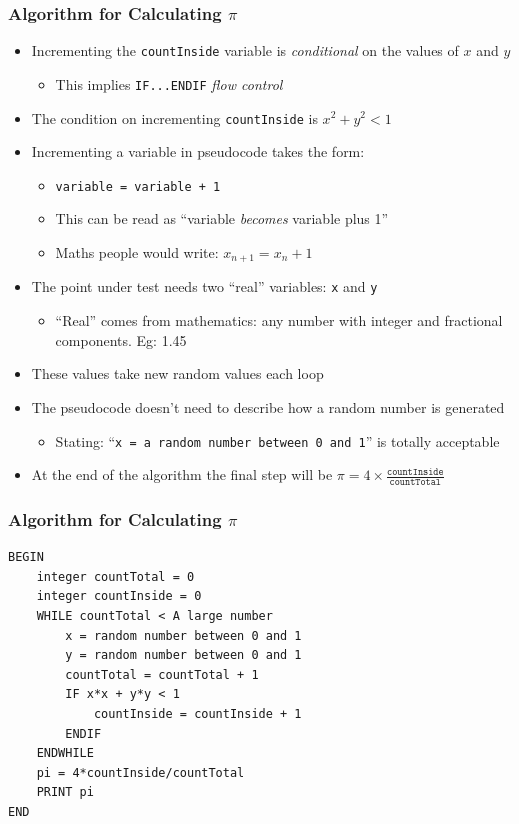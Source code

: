 \documentclass[14pt]{beamer}
\begin{document}
\begin{frame}
\frametitle{Algorithm for Calculating $\pi$}
\begin{itemize}
\item Incrementing the \texttt{countInside} variable is \textit{conditional} on the values of $x$ and $y$
	\begin{itemize}
		\item This implies \texttt{IF...ENDIF} \textit{flow control}
	\end{itemize}
\pause
\item The condition on incrementing \texttt{countInside} is $x^2 + y^2 < 1$
\pause
\item Incrementing a variable in pseudocode takes the form:
	\begin{itemize}
		\item \texttt{variable = variable + 1}
		\item This can be read as ``variable \textit{becomes} variable plus 1''
		\item Maths people would write: $x_{n+1} = x_n + 1$
	\end{itemize}
\end{itemize}
\end{frame}

\begin{frame}
\begin{itemize}
\item The point under test needs two ``real'' variables: \texttt{x} and \texttt{y}
	\begin{itemize}
 		\item ``Real'' comes from mathematics: any number with integer and fractional components. Eg: 1.45
	\end{itemize}
\item These values take new random values each loop
\item The pseudocode doesn't need to describe how a random number is generated
	\begin{itemize}
		\item Stating: ``\texttt{x = a random number between 0 and 1}'' is totally acceptable
	\end{itemize}
\item At the end of the algorithm the final step will be $\pi = 4\times \frac{\texttt{countInside}}{\texttt{countTotal}}$
\end{itemize}
\end{frame}


\begin{frame}[fragile]
\frametitle{Algorithm for Calculating $\pi$}
\begin{lstlisting}[style=pseudo]
BEGIN
	integer countTotal = 0
	integer countInside = 0
	WHILE countTotal < A large number
		x = random number between 0 and 1
		y = random number between 0 and 1
		countTotal = countTotal + 1
		IF x*x + y*y < 1
			countInside = countInside + 1
		ENDIF
	ENDWHILE
	pi = 4*countInside/countTotal
	PRINT pi
END
\end{lstlisting}
\end{frame}
\end{document}

